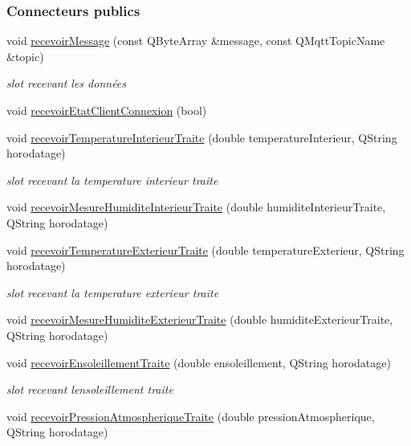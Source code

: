 \subsubsection*{Connecteurs publics}
\begin{DoxyCompactItemize}
\item 
void \hyperlink{class_ruche_a05a34e78d360609f772b9a37c69d0043}{recevoir\+Message} (const Q\+Byte\+Array \&message, const Q\+Mqtt\+Topic\+Name \&topic)
\begin{DoxyCompactList}\small\item\em slot recevant les données \end{DoxyCompactList}\item 
void \hyperlink{class_ruche_a1224416341dc2b33418dd296327ae410}{recevoir\+Etat\+Client\+Connexion} (bool)
\item 
void \hyperlink{class_ruche_a3a5934e6da843c959f34aecef1217f92}{recevoir\+Temperature\+Interieur\+Traite} (double temperature\+Interieur, Q\+String horodatage)
\begin{DoxyCompactList}\small\item\em slot recevant la temperature interieur traite \end{DoxyCompactList}\item 
void \hyperlink{class_ruche_aab8b4958b32aad9af790963903e4788e}{recevoir\+Mesure\+Humidite\+Interieur\+Traite} (double humidite\+Interieur\+Traite, Q\+String horodatage)
\item 
void \hyperlink{class_ruche_a1d9b1d3aad20f206f27de4093b4a136f}{recevoir\+Temperature\+Exterieur\+Traite} (double temperature\+Exterieur, Q\+String horodatage)
\begin{DoxyCompactList}\small\item\em slot recevant la temperature exterieur traite \end{DoxyCompactList}\item 
void \hyperlink{class_ruche_a2d19d8438eae55c1d76691398087f079}{recevoir\+Mesure\+Humidite\+Exterieur\+Traite} (double humidite\+Exterieur\+Traite, Q\+String horodatage)
\item 
void \hyperlink{class_ruche_a581320fbd44c1752d10aa0e6e533863c}{recevoir\+Ensoleillement\+Traite} (double ensoleillement, Q\+String horodatage)
\begin{DoxyCompactList}\small\item\em slot recevant l\textquotesingle{}ensoleillement traite \end{DoxyCompactList}\item 
void \hyperlink{class_ruche_a3b43ce547e616ee0b14e3a0e0aa44a4d}{recevoir\+Pression\+Atmospherique\+Traite} (double pression\+Atmospherique, Q\+String horodatage)

\end{DoxyCompactItemize}
